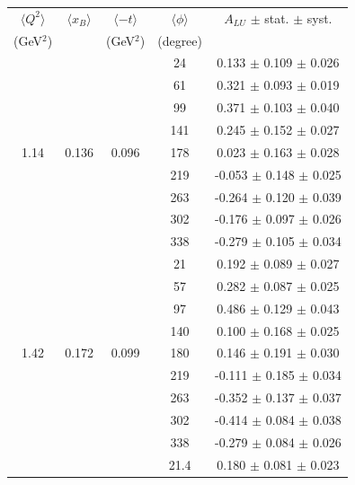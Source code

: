 \documentclass{article}
\begin{document}
\begin{table}[!h]
   \begin{center}
      \begin{tabular}{|c|c|c|c|c|}
         \hline
 $\langle Q^{2} \rangle$ & $\langle x_{B} \rangle$ & $\langle -t \rangle$ & $\langle \phi \rangle$ & $A_{LU}$ $\pm$ stat. $\pm$ syst.\\
 (GeV$^{2}$) &           & (GeV$^{2}$) & (degree) &  \\
         \hline
        &       &       & 24    &  0.133  $\pm$ 0.109  $\pm$ 0.026  \\ 
        &       &       & 61    &  0.321  $\pm$ 0.093  $\pm$ 0.019  \\ 
        &       &       & 99    &  0.371  $\pm$ 0.103  $\pm$ 0.040  \\ 
        &       &       & 141   &  0.245  $\pm$ 0.152  $\pm$ 0.027  \\ 
  1.14  & 0.136 & 0.096 & 178   &  0.023  $\pm$ 0.163  $\pm$ 0.028  \\ 
        &       &       & 219   & -0.053  $\pm$ 0.148  $\pm$ 0.025  \\ 
        &       &       & 263   & -0.264  $\pm$ 0.120  $\pm$ 0.039  \\ 
        &       &       & 302   & -0.176  $\pm$ 0.097  $\pm$ 0.026  \\ 
        &       &       & 338   & -0.279  $\pm$ 0.105  $\pm$ 0.034  \\ 
  \hline 
        &       &       &  21   &  0.192  $\pm$ 0.089  $\pm$ 0.027  \\ 
        &       &       &  57   &  0.282  $\pm$ 0.087  $\pm$ 0.025  \\ 
        &       &       &  97   &  0.486  $\pm$ 0.129  $\pm$ 0.043  \\ 
        &       &       & 140   &  0.100  $\pm$ 0.168  $\pm$ 0.025  \\ 
  1.42  & 0.172 & 0.099 & 180   &  0.146  $\pm$ 0.191  $\pm$ 0.030  \\ 
        &       &       & 219   & -0.111  $\pm$ 0.185  $\pm$ 0.034  \\ 
        &       &       & 263   & -0.352  $\pm$ 0.137  $\pm$ 0.037  \\ 
        &       &       & 302   & -0.414  $\pm$ 0.084  $\pm$ 0.038  \\ 
        &       &       & 338   & -0.279  $\pm$ 0.084  $\pm$ 0.026  \\ 
  \hline 
        &       &       &  21.4 &  0.180  $\pm$ 0.081  $\pm$ 0.023  \\ 

\end{tabular}
\end{center}
\end{table}
\end{document}
